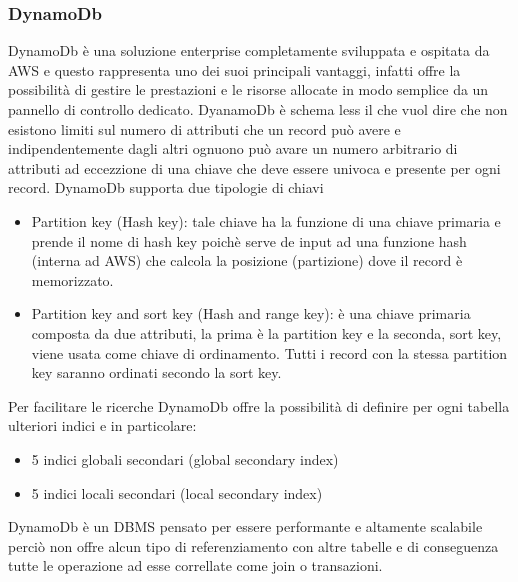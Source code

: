 \subsubsection*{DynamoDb}
DynamoDb è una soluzione enterprise completamente sviluppata e ospitata da AWS e questo rappresenta uno dei suoi principali vantaggi, infatti offre la possibilità di gestire le prestazioni e le risorse allocate in modo semplice da un pannello di controllo dedicato. DyanamoDb è schema less il che vuol dire che non esistono limiti sul numero di attributi che un record può avere e indipendentemente dagli altri ognuono può avare un numero arbitrario di attributi ad eccezzione di una chiave che deve essere univoca e presente per ogni record. DynamoDb supporta due tipologie di chiavi
\begin{itemize}
	\item Partition key (Hash key): tale chiave ha la funzione di una chiave primaria e prende il nome di hash key poichè serve de input ad una funzione hash (interna ad AWS) che calcola la posizione (partizione) dove il record è memorizzato.

	\item Partition key and sort key (Hash and range key): è una chiave primaria composta da due attributi, la prima è la partition key e la seconda, sort key, viene usata come chiave di ordinamento. Tutti i record con la stessa partition key saranno ordinati secondo la sort key. 
\end{itemize}
 Per facilitare le ricerche DynamoDb offre la possibilità di definire per ogni tabella ulteriori indici e in particolare:

\begin{itemize}
	\item 5 indici globali secondari (global secondary index)
	\item 5 indici locali secondari (local secondary index)
\end{itemize}
DynamoDb è un DBMS pensato per essere performante e altamente scalabile perciò non offre alcun tipo di referenziamento con altre tabelle e di conseguenza tutte le operazione ad esse correllate come join o transazioni.

